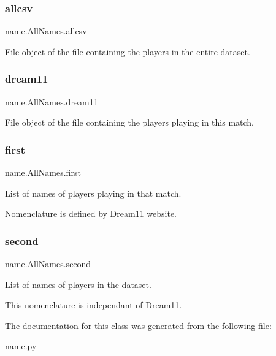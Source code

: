 \subsubsection{\texorpdfstring{allcsv}{allcsv}}
{\footnotesize\ttfamily name.\+All\+Names.\+allcsv}



File object of the file containing the players in the entire dataset. 

\mbox{\label{classname_1_1AllNames_a3fe1dd6f5e33b95faf2eca8d8dce3cc1}} 
\subsubsection{\texorpdfstring{dream11}{dream11}}
{\footnotesize\ttfamily name.\+All\+Names.\+dream11}



File object of the file containing the players playing in this match. 

\mbox{\label{classname_1_1AllNames_af05034a1d261190ebd396ee615052d8e}} 
\subsubsection{\texorpdfstring{first}{first}}
{\footnotesize\ttfamily name.\+All\+Names.\+first}



List of names of players playing in that match. 

Nomenclature is defined by Dream11 website. \mbox{\label{classname_1_1AllNames_a414e627444762afcc47ead0015f1dcce}} 
\subsubsection{\texorpdfstring{second}{second}}
{\footnotesize\ttfamily name.\+All\+Names.\+second}



List of names of players in the dataset. 

This nomenclature is independant of Dream11. 

The documentation for this class was generated from the following file\+:\begin{DoxyCompactItemize}
\item 
name.\+py\end{DoxyCompactItemize}
